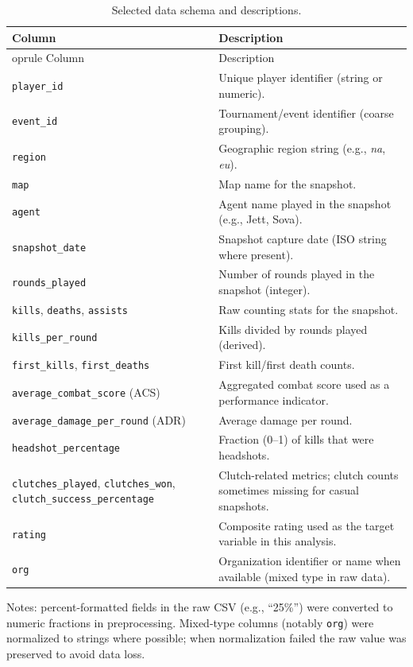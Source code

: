 \documentclass[11pt]{article}
\begin{document}
\begin{longtable}{@{}p{}p{}@{}}
\caption{Selected data schema and descriptions.}\label{tab:schema}\\
\toprule
Column & Description \\
\midrule
\endfirsthead
	oprule
Column & Description \\
\midrule
\endhead
\bottomrule
\endfoot
  \texttt{player\_id} & Unique player identifier (string or numeric). \\
  \texttt{event\_id} & Tournament/event identifier (coarse grouping). \\
  \texttt{region} & Geographic region string (e.g., \textit{na}, \textit{eu}). \\
  \texttt{map} & Map name for the snapshot. \\
  \texttt{agent} & Agent name played in the snapshot (e.g., Jett, Sova). \\
  \texttt{snapshot\_date} & Snapshot capture date (ISO string where present). \\
  \texttt{rounds\_played} & Number of rounds played in the snapshot (integer). \\
  \texttt{kills}, \texttt{deaths}, \texttt{assists} & Raw counting stats for the snapshot. \\
  \texttt{kills\_per\_round} & Kills divided by rounds played (derived). \\
  \texttt{first\_kills}, \texttt{first\_deaths} & First kill/first death counts. \\
  \texttt{average\_combat\_score} (ACS) & Aggregated combat score used as a performance indicator. \\
  \texttt{average\_damage\_per\_round} (ADR) & Average damage per round. \\
  \texttt{headshot\_percentage} & Fraction (0--1) of kills that were headshots. \\
  \texttt{clutches\_played}, \texttt{clutches\_won}, \texttt{clutch\_success\_percentage} & Clutch-related metrics; clutch counts sometimes missing for casual snapshots. \\
  \texttt{rating} & Composite rating used as the target variable in this analysis. \\
  \texttt{org} & Organization identifier or name when available (mixed type in raw data). \\
\end{longtable}

Notes: percent-formatted fields in the raw CSV (e.g., ``25\%'') were converted to numeric fractions in preprocessing. Mixed-type columns (notably \texttt{org}) were normalized to strings where possible; when normalization failed the raw value was preserved to avoid data loss.
\end{document}
